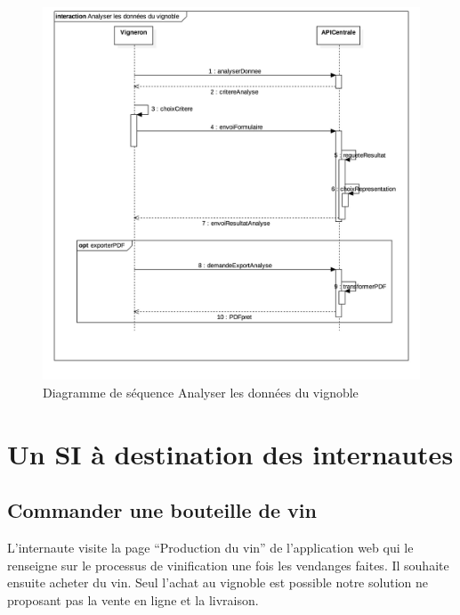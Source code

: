 \documentclass[a4paper, titlepage]{report}
\begin{document}
\clearpage
\begin{figure}[!ht]
\centering
\includegraphics{Images/SequenceDiagramAnalyserDonneesVignoble.jpg}
\caption{Diagramme de séquence Analyser les données du vignoble}
\end{figure}

\clearpage
\section{Un SI à destination des internautes}

\subsection{Commander une bouteille de vin}

L'internaute visite la page ``Production du vin'' de l'application web qui le
renseigne sur le processus de vinification une fois les vendanges
faites. Il souhaite ensuite acheter du vin. Seul l'achat au vignoble est
possible notre solution ne proposant pas la vente en ligne et la
livraison.
\end{document}
